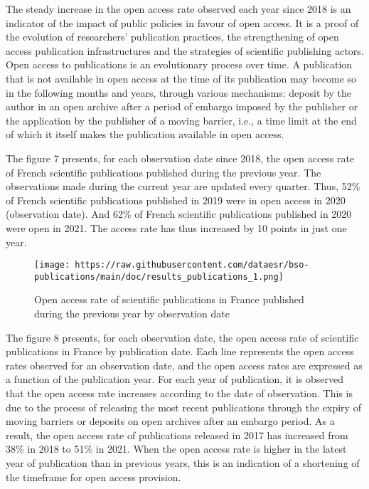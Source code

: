 \documentclass[
]{article}
\begin{document}
The steady increase in the open access rate observed each year since
2018 is an indicator of the impact of public policies in favour of open
access. It is a proof of the evolution of researchers' publication
practices, the strengthening of open access publication infrastructures
and the strategies of scientific publishing actors. Open access to
publications is an evolutionary process over time. A publication that is
not available in open access at the time of its publication may become
so in the following months and years, through various mechanisms:
deposit by the author in an open archive after a period of embargo
imposed by the publisher or the application by the publisher of a moving
barrier, i.e., a time limit at the end of which it itself makes the
publication available in open access.

The figure 7 presents, for each observation date since 2018, the open
access rate of French scientific publications published during the
previous year. The observations made during the current year are updated
every quarter. Thus, 52\% of French scientific publications published in
2019 were in open access in 2020 (observation date). And 62\% of French
scientific publications published in 2020 were open in 2021. The access
rate has thus increased by 10 points in just one year.

\begin{figure}
\centering
\texttt{[image: https://raw.githubusercontent.com/dataesr/bso-publications/main/doc/results\_publications\_1.png]}
\caption{Open access rate of scientific publications in France published
during the previous year by observation date}
\end{figure}

The figure 8 presents, for each observation date, the open access rate
of scientific publications in France by publication date. Each line
represents the open access rates observed for an observation date, and
the open access rates are expressed as a function of the publication
year. For each year of publication, it is observed that the open access
rate increases according to the date of observation. This is due to the
process of releasing the most recent publications through the expiry of
moving barriers or deposits on open archives after an embargo period. As
a result, the open access rate of publications released in 2017 has
increased from 38\% in 2018 to 51\% in 2021. When the open access rate
is higher in the latest year of publication than in previous years, this
is an indication of a shortening of the timeframe for open access
provision.
\end{document}
